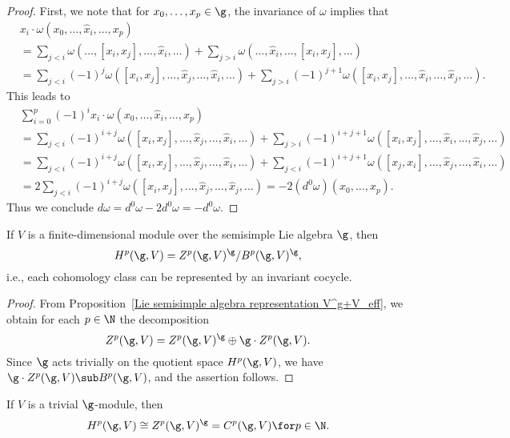 \begin{proof}
First, we note that for $x_0,\dots,x_p\in\g$, the invariance of $\omega$ implies that
\begin{equation*}\scriptstyle
\begin{aligned}
&x_i\cdot\omega(x_0,\dots,\widehat{x}_i,\dots,x_p)\\
&=\sum_{j<i}\omega(\dots,[x_i,x_j],\dots,\widehat{x}_i,\dots)+\sum_{j>i}\omega(\dots,\widehat{x}_i,\dots,[x_i,x_j],\dots)\\
&=\sum_{j<i}(-1)^j\omega([x_i,x_j],\dots,\widehat{x}_j,\dots,\widehat{x}_i,\dots)+\sum_{j>i}(-1)^{j+1}\omega([x_i,x_j],\dots,\widehat{x}_i,\dots,\widehat{x}_j,\dots).
\end{aligned}
\end{equation*}
This leads to
\begin{equation*}\scriptstyle
\begin{aligned}
&\sum_{i=0}^{p}(-1)^ix_i\cdot\omega(x_0,\dots,\widehat{x}_i,\dots,x_p)\\
&=\sum_{j<i}(-1)^{i+j}\omega([x_i,x_j],\dots,\widehat{x}_j,\dots,\widehat{x}_i,\dots)+\sum_{j>i}(-1)^{i+j+1}\omega([x_i,x_j],\dots,\widehat{x}_i,\dots,\widehat{x}_j,\dots)\\
&=\sum_{j<i}(-1)^{i+j}\omega([x_i,x_j],\dots,\widehat{x}_j,\dots,\widehat{x}_i,\dots)+\sum_{j<i}(-1)^{i+j+1}\omega([x_j,x_i],\dots,\widehat{x}_j,\dots,\widehat{x}_i,\dots)\\
&=2\sum_{j<i}(-1)^{i+j}\omega([x_i,x_j],\dots,\widehat{x}_j,\dots,\widehat{x}_j,\dots)=-2(d^0\omega)(x_0,\dots,x_p).
\end{aligned}
\end{equation*}
Thus we conclude $d\omega=d^0\omega-2d^0\omega=-d^0\omega$.
\end{proof}
\begin{proposition}\label{Lie algebra semisimple cohomology by invariant form}
If $V$ is a finite-dimensional module over the semisimple Lie algebra $\g$, then
\[H^p(\g,V)=Z^p(\g,V)^\g/B^p(\g,V)^\g,\]
i.e., each cohomology class can be represented by an invariant cocycle.
\end{proposition}
\begin{proof}
From Proposition~\ref{Lie semisimple algebra representation V^g+V_eff}, we obtain for each $p\in\N$ the decomposition
\[Z^p(\g,V)=Z^p(\g,V)^\g\oplus\g\cdot Z^p(\g,V).\]
Since $\g$ acts trivially on the quotient space $H^p(\g,V)$, we have $\g\cdot Z^p(\g,V)\sub B^p(\g,V)$, and the assertion follows.
\end{proof}
\begin{proposition}
If $V$ is a trivial $\g$-module, then
\[H^p(\g,V)\cong Z^p(\g,V)^\g=C^p(\g,V)\for p\in\N.\]
\end{proposition}
